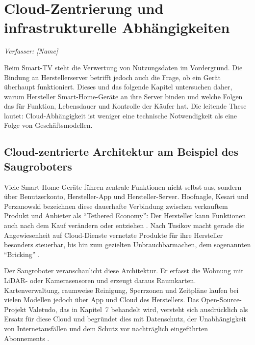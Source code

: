 \chapter{Cloud-Zentrierung und infrastrukturelle Abhängigkeiten}\label{chap:cloud-ursachen}
\noindent\textit{Verfasser: [Name]}


Beim Smart-TV steht die Verwertung von Nutzungsdaten im Vordergrund. Die
Bindung an Herstellerserver betrifft jedoch auch die Frage, ob ein Gerät
überhaupt funktioniert. Dieses und das folgende Kapitel untersuchen daher,
warum Hersteller Smart-Home-Geräte an ihre Server binden und welche Folgen
das für Funktion, Lebensdauer und Kontrolle der Käufer hat. Die leitende
These lautet: Cloud-Abhängigkeit ist weniger eine technische Notwendigkeit
als eine Folge von Geschäftsmodellen.

\section{Cloud-zentrierte Architektur am Beispiel des Saugroboters}\label{sec:cloud-architektur}

Viele Smart-Home-Geräte führen zentrale Funktionen nicht selbst aus, sondern
über Benutzerkonto, Hersteller-App und Hersteller-Server. Hoofnagle, Kesari
und Perzanowski bezeichnen diese dauerhafte Verbindung zwischen verkauftem
Produkt und Anbieter als \enquote{Tethered Economy}: Der Hersteller kann
Funktionen auch nach dem Kauf verändern oder entziehen
\autocite[vgl.][]{hoofnagle:2019}. Nach Tusikov macht gerade die
Angewiesenheit auf Cloud-Dienste vernetzte Produkte für ihre Hersteller
besonders steuerbar, bis hin zum gezielten Unbrauchbarmachen, dem
sogenannten \enquote{Bricking} \autocite[vgl.][S.~2, 7]{tusikov:2019}.

Der Saugroboter veranschaulicht diese Architektur. Er erfasst die Wohnung
mit LiDAR- oder Kamerasensoren und erzeugt daraus Raumkarten. Kartenverwaltung,
raumweise Reinigung, Sperrzonen und Zeitpläne laufen bei vielen Modellen
jedoch über App und Cloud des Herstellers. Das Open-Source-Projekt Valetudo,
das in Kapitel~7 behandelt wird, versteht sich ausdrücklich als Ersatz für
diese Cloud und begründet dies mit Datenschutz, der Unabhängigkeit von
Internetausfällen und dem Schutz vor nachträglich eingeführten Abonnements
\autocite[vgl.][]{valetudo:2025}.

